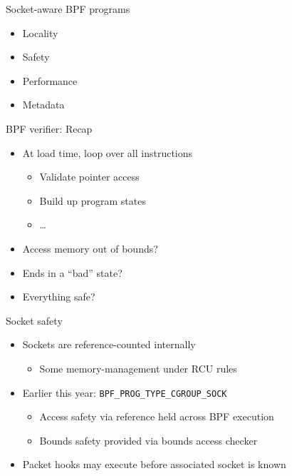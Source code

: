 \documentclass[black,white]{beamer}
\newcommand{\cmark}{\ding{51}}%
\newcommand{\bigcmark}{{\large\textcolor{green}\cmark}}
\newcommand{\xmark}{\ding{55}}
\newcommand{\bigxmark}{{\large\textcolor{red}\xmark}}
\begin{document}
    \begin{frame}{Socket-aware BPF programs}
	\begin{itemize}
            \item Locality \medskip
	    \item Safety \medskip
            \item Performance \medskip
            \item Metadata \medskip
	\end{itemize}
    \end{frame}

    \begin{frame}[fragile]{BPF verifier: Recap}
	\begin{itemize}
	    \item At load time, loop over all instructions \smallskip
            \begin{itemize}
                \item Validate pointer access \medskip
                \item Build up program states \medskip
                \item \ldots \medskip
            \end{itemize}
            \item Access memory out of bounds? \bigxmark \medskip
            \item Ends in a ``bad'' state? \bigxmark \medskip
            \item Everything safe? \bigcmark \medskip
	\end{itemize}
    \end{frame}

    \begin{frame}[fragile]{Socket safety}
        \begin{itemize}
            \item Sockets are reference-counted internally \smallskip
            \begin{itemize}
                \item Some memory-management under RCU rules \medskip
            \end{itemize}
            \item Earlier this year: \verb+BPF_PROG_TYPE_CGROUP_SOCK+ \smallskip
            \begin{itemize}
                \item Access safety via reference held across BPF execution \medskip
                \item Bounds safety provided via bounds access checker \medskip
            \end{itemize}
            \item Packet hooks may execute before associated socket is known \medskip
        \end{itemize}
    \end{frame}
\end{document}
